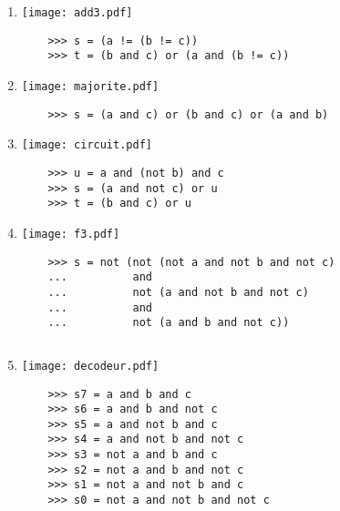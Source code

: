 \begin{description}
\begin{enumerate}
	\item \begin{minipage}{6cm}\texttt{[image: add3.pdf]}\end{minipage}
	\hspace*{3mm}
	\begin{py}{8cm}
	\begin{verbatim}
	>>> s = (a != (b != c))
	>>> t = (b and c) or (a and (b != c))
	\end{verbatim}
	\end{py}

	\item \begin{minipage}{6cm}\texttt{[image: majorite.pdf]}\end{minipage}
	\hspace*{3mm}
	\begin{py}{8cm}
	\begin{verbatim}
	>>> s = (a and c) or (b and c) or (a and b)
	\end{verbatim}
	\end{py}

	\item \begin{minipage}{6cm}\texttt{[image: circuit.pdf]}\end{minipage}
	\hspace*{3mm}
	\begin{py}{8cm}
	\begin{verbatim}
	>>> u = a and (not b) and c
	>>> s = (a and not c) or u
	>>> t = (b and c) or u
	\end{verbatim}
	\end{py}

	\item \begin{minipage}{6cm}\texttt{[image: f3.pdf]}\end{minipage}
	\hspace*{3mm}
	\begin{py}{8cm}
	\begin{verbatim}
	>>> s = not (not (not a and not b and not c)
	...          and
	...          not (a and not b and not c)
	...          and
	...          not (a and b and not c))
	\end{verbatim}
	\end{py}

	$$$$
	
	\item \begin{minipage}{6cm}\texttt{[image: decodeur.pdf]}\end{minipage}
	\hspace*{3mm}
	\begin{py}{8cm}
	\begin{verbatim}
	>>> s7 = a and b and c
	>>> s6 = a and b and not c
	>>> s5 = a and not b and c
	>>> s4 = a and not b and not c
	>>> s3 = not a and b and c
	>>> s2 = not a and b and not c
	>>> s1 = not a and not b and c
	>>> s0 = not a and not b and not c
	\end{verbatim}
	\end{py}
	\end{enumerate}


\end{description}
